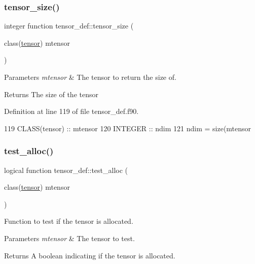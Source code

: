 \subsubsection{\texorpdfstring{tensor\+\_\+size()}{tensor\_size()}}
{\footnotesize\ttfamily integer function tensor\+\_\+def\+::tensor\+\_\+size (\begin{DoxyParamCaption}\item[{class(\hyperlink{structtensor__def_1_1tensor}{tensor})}]{mtensor }\end{DoxyParamCaption})\hspace{0.3cm}{\ttfamily [private]}}


\begin{DoxyParams}{Parameters}
{\em mtensor} & The tensor to return the size of. \\
\hline
\end{DoxyParams}
\begin{DoxyReturn}{Returns}
The size of the tensor 
\end{DoxyReturn}


Definition at line 119 of file tensor\+\_\+def.\+f90.


\begin{DoxyCode}
119     \textcolor{keywordtype}{CLASS}(tensor) :: mtensor
120     \textcolor{keywordtype}{INTEGER} :: ndim
121     ndim = \textcolor{keyword}{size}(mtensor%
\end{DoxyCode}
\mbox{\label{namespacetensor__def_a165f6b711a4448ec8aa9cee9873fd2f6}} 
\subsubsection{\texorpdfstring{test\+\_\+alloc()}{test\_alloc()}}
{\footnotesize\ttfamily logical function tensor\+\_\+def\+::test\+\_\+alloc (\begin{DoxyParamCaption}\item[{class(\hyperlink{structtensor__def_1_1tensor}{tensor})}]{mtensor }\end{DoxyParamCaption})}



Function to test if the tensor is allocated. 


\begin{DoxyParams}{Parameters}
{\em mtensor} & The tensor to test. \\
\hline
\end{DoxyParams}
\begin{DoxyReturn}{Returns}
A boolean indicating if the tensor is allocated. 
\end{DoxyReturn}


